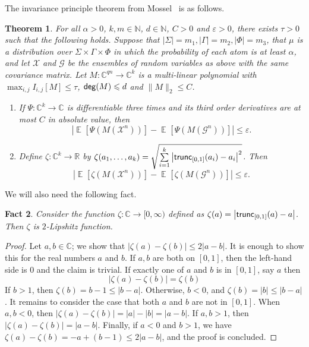 \documentclass[11pt]{article}
\newtheorem{thm}{Theorem}[section]
\newtheorem{fact}[thm]{Fact}
\newcommand\card[1]{\left| {#1} \right|}
\newcommand\Expect[2]{{\mathop{\mathbb{E}}_{#1}\left[ {#2} \right]}}
\newcommand\eps{\varepsilon}
\renewcommand\leq{\leqslant}
\begin{document}
The invariance principle theorem from Mossel~\cite{Mossel} is as follows.
\begin{thm}\label{thm:invariance_principle}
	For all $\alpha>0$, $k,m\in\mathbb{N}$, $d\in\mathbb{N}$, $C>0$ and $\eps>0$, there exists $\tau>0$
	such that the following holds. Suppose that $\card{\Sigma} = m_1, \card{\Gamma} = m_2,\card{\Phi}= m_3$,
	that $\mu$ is a distribution over $\Sigma\times\Gamma\times\Phi$ in which the probability
	of each atom is at least $\alpha$, and let $\mathcal{X}$ and $\mathcal{G}$ be the ensembles
	of random variables as above with the same covariance matrix. Let $M\colon\mathbb{C}^{qn}\to\mathbb{C}^k$
	is a multi-linear polynomial with $\max_{i,j}I_{i,j}[M]\leq \tau$, ${\sf deg}(M) \leq d$ and $\|M\|_2 \leq C$.
	\begin{enumerate}
		\item 
         If $\Psi\colon \mathbb{C}^{k}\to\mathbb{C}$ is differentiable three times and its third order derivatives
		are at most $C$ in absolute value, then
		\[
		\card{\Expect{}{\Psi(M(\mathcal{X}^n))}-\Expect{}{\Psi(M(\mathbf{\mathcal{G}}^n))}}\leq \eps.
		\]
		 \item Define $\zeta\colon \mathbb{C}^k\to \mathbb{R}$ by $\zeta(a_1,\ldots,a_k) = \sqrt{\sum\limits_{i=1}^{k}\card{{\sf trunc}_{[0,1]}(a_i) - a_i}^2}$.
		Then
		\[
		\card{\Expect{}{\zeta(M(\mathcal{X}^n))}-\Expect{}{\zeta(M(\mathcal{G}^n))}}\leq \eps.
		\]
	\end{enumerate}
\end{thm}


We will also need the following fact.
\begin{fact}\label{fact:trivial_lipshitz_pf}
	Consider the function $\zeta\colon \mathbb{C}\to [0,\infty)$ defined as
	$\zeta(a) = \card{{\sf trunc}_{[0,1]}(a) - a}$. Then $\zeta$ is $2$-Lipshitz function.
\end{fact}
\begin{proof}
	Let $a,b\in\mathbb{C}$; we show that $\card{\zeta(a) - \zeta(b)} \leq 2\card{a-b}$. It is enough to show this for the real numbers $a$ and $b$.  
	If $a,b$ are both on $[0,1]$, then the left-hand side is
	$0$ and the claim is trivial. If exactly one of $a$ and $b$ is in $[0,1]$, say $a$ then
	\[
	\card{\zeta(a) - \zeta(b)} =
	\zeta(b)
	\]
	If $b>1$, then $\zeta(b) = b-1 \leq \card{b-a}$. Otherwise, $b<0$, and $\zeta(b) = |b|\leq \card{b-a}$. It remains to consider the case that both $a$ and $b$ are not in $[0,1]$. When $a, b<0$, then $\card{\zeta(a) - \zeta(b)} = \card{a}-\card{b} =  \card{a-b}$. If $a, b>1$, then $\card{\zeta(a) - \zeta(b)} = \card{a-b}$. Finally, if $a<0$ and $b>1$, we have $\zeta(a) - \zeta(b) = -a+(b-1)\leq 2\card{a-b}$,
	and the proof is concluded.
\end{proof}
\end{document}
